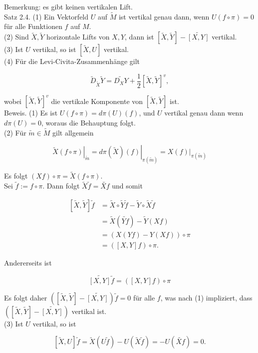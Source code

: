 \documentclass[10pt, letterpaper]{article}
\begin{document}
Bemerkung: es gibt keinen vertikalen Lift.\\
Satz 2.4. (1) Ein Vektorfeld $U$ auf $\tilde{M}$ ist vertikal genau dann, wenn $U(f \circ \pi)=0$ für alle Funktionen $f$ auf $M$.\\
(2) Sind $\tilde{X}, \tilde{Y}$ horizontale Lifts von $X, Y$, dann ist $[\tilde{X}, \tilde{Y}]-\widetilde{[X, Y]}$ vertikal.\\
(3) Ist $U$ vertikal, so ist $[\tilde{X}, U]$ vertikal.\\
(4) Für die Levi-Civita-Zusammenhänge gilt

$$
\tilde{D}_{\tilde{X}} \tilde{Y}=\widetilde{D_{X} Y}+\frac{1}{2}[\tilde{X}, \tilde{Y}]^{v},
$$

wobei $[\tilde{X}, \tilde{Y}]^{v}$ die vertikale Komponente von $[\tilde{X}, \tilde{Y}]$ ist.\\
Beweis. (1) Es ist $U(f \circ \pi)=d \pi(U)(f)$, und $U$ vertikal genau dann wenn $d \pi(U)=0$, woraus die Behauptung folgt.\\
(2) Für $\tilde{m} \in \tilde{M}$ gilt allgemein

$$
\left.\tilde{X}(f \circ \pi)\right|_{\tilde{m}}=\left.d \pi(\tilde{X})(f)\right|_{\pi(\tilde{m})}=\left.X(f)\right|_{\pi(\tilde{m})}
$$

Es folgt $(X f) \circ \pi=\tilde{X}(f \circ \pi)$.\\
Sei $\tilde{f}:=f \circ \pi$. Dann folgt $\tilde{X} \tilde{f}=\widetilde{X f}$ und somit

$$
\begin{aligned}
{[\tilde{X}, \tilde{Y}] \tilde{f} } & =\tilde{X} \circ \tilde{Y} \tilde{f}-\tilde{Y} \circ \tilde{X} \tilde{f} \\
& =\tilde{X}(\tilde{Y f})-\tilde{Y}(X f) \\
& =(X(Y f)-Y(X f)) \circ \pi \\
& =([X, Y] f) \circ \pi .
\end{aligned}
$$

Andererseits ist

$$
\widetilde{[X, Y]} \tilde{f}=([X, Y] f) \circ \pi
$$

Es folgt daher $([\tilde{X}, \tilde{Y}]-\widetilde{[X, Y]}) \tilde{f}=0$ für alle $f$, was nach (1) impliziert, dass $([\tilde{X}, \tilde{Y}]-\widetilde{[X, Y]})$ vertikal ist.\\
(3) Ist $U$ vertikal, so ist

$$
[\tilde{X}, U] \tilde{f}=\tilde{X}(U \tilde{f})-U(\tilde{X} \tilde{f})=-U(\widetilde{X f})=0 .
$$
\end{document}
